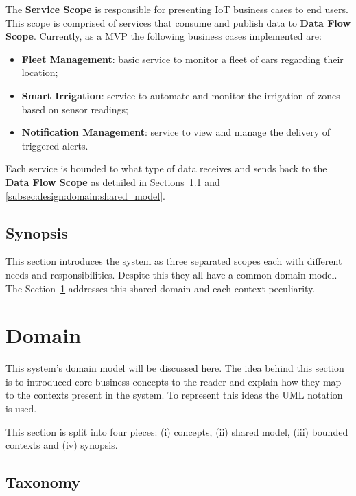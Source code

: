 The \textbf{Service Scope} is responsible for presenting \gls{IoT} business cases to end users. This scope is comprised of services that consume and publish data to \textbf{Data Flow Scope}. Currently, as a \gls{MVP} the following business cases implemented are:

\begin{itemize}
   \item \textbf{Fleet Management}: basic service to monitor a fleet of cars regarding their location;
   \item \textbf{Smart Irrigation}: service to automate and monitor the irrigation of zones based on sensor readings;
   \item \textbf{Notification Management}: service to view and manage the delivery of triggered alerts.
\end{itemize}

Each service is bounded to what type of data receives and sends back to the \textbf{Data Flow Scope} as detailed in Sections~\ref{subsec:design:domain:taxonomy} and \ref{subsec:design:domain:shared_model}.

\subsection{Synopsis}
\label{subsec:design:system_scopes:synopsis}

This section introduces the system as three separated scopes each with different needs and responsibilities. Despite this they all have a common domain model. The Section~\ref{sec:design:domain} addresses this shared domain and each context peculiarity.

\section{Domain}
\label{sec:design:domain}

This system's domain model will be discussed here. The idea behind this section is to introduced core business concepts to the reader and explain how they map to the contexts present in the system. To represent this ideas the \gls{UML} notation is used.

This section is split into four pieces: (i) concepts, (ii) shared model, (iii) bounded contexts and (iv) synopsis.

\subsection{Taxonomy}
\label{subsec:design:domain:taxonomy}

